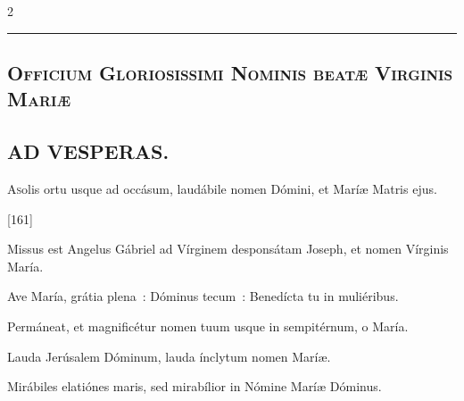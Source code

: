 \documentclass[9pt,twoside]{extarticle}
\begin{document}
\begin{multicols}{2}
\begin{center}\textcolor{red}{\rule{\linewidth}{0.5pt}} \end{center}

\subsection*{\center \textsc{Officium Gloriosissimi Nominis beatæ Virginis Mariæ}}
\subsubsection*{\center {}}
\begin{center}\end{center}


\subsection*{\center \textsc{AD VESPERAS.}}
\begin{center}\end{center}
\lettrine{A} solis ortu usque ad occásum, laudábile nomen Dómini, et Maríæ Matris ejus.

\begin{tightlist}{}
\item {} [161]
\item {} Missus est Angelus Gábriel ad Vírginem desponsátam Joseph, et nomen Vírginis María.
\item {} Ave María, grátia plena~: Dóminus tecum~: Benedícta tu in muliéribus.
\item {} Permáneat, et magnificétur nomen tuum usque in sempitérnum, o María.
\item {} Lauda Jerúsalem Dóminum, lauda ínclytum nomen Maríæ.
\item {} Mirábiles elatiónes maris, sed mirabílior in Nómine Maríæ Dóminus. 
\end{tightlist}


\end{multicols}
\end{document}
